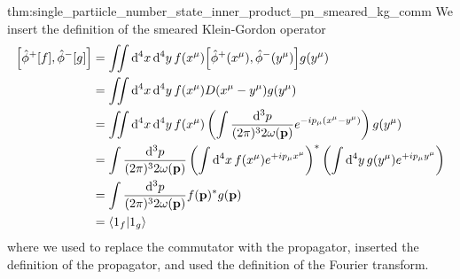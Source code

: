 \begin{delayedproof}{thm:single_partiicle_number_state_inner_product_pn_smeared_kg_comm}
	We insert the definition of the smeared Klein-Gordon operator
	\begin{equation*}
		\begin{split}
			\comm{\hat\phi^+[f]}{\hat\phi^-[g]}
			&=
			\iint\dd[4]{x}\dd[4]{y}
			f(x^\mu)
			\comm{\hat\phi^+(x^\mu)}{\hat\phi^-(y^\mu)}
			g(y^\mu)
			\\
			&=
			\iint\dd[4]{x}\dd[4]{y}
			f(x^\mu)
			D(x^\mu-y^\mu)
			g(y^\mu)
			\\
			&=
			\iint\dd[4]{x}\dd[4]{y}
			f(x^\mu)
			\left(
				\int\frac{\dd[3]{p}}{(2\pi)^32\omega(\vb{p})}
				e^{-ip_\mu (x^\mu-y^\mu)}
			\right)
			g(y^\mu)
			\\
			&=
			\int\frac{\dd[3]{p}}{(2\pi)^32\omega(\vb{p})}
			\left(
				\int\dd[4]{x}
				f(x^\mu)
				e^{+ip_\mu x^\mu}
			\right)^*
			\left(
				\int\dd[4]{y}
				g(y^\mu)
				e^{+ip_\mu y^\mu}
			\right)
			\\
			&=
			\int\frac{\dd[3]{p}}{(2\pi)^32\omega(\vb{p})}
			f(\vb{p})^*
			g(\vb{p})
			\\
			&=
			\braket{1_f}{1_g}
		\end{split}
	\end{equation*}
	where we used  to replace the commutator with the propagator, inserted the definition of the propagator, and used the definition of the Fourier transform.
\end{delayedproof}

